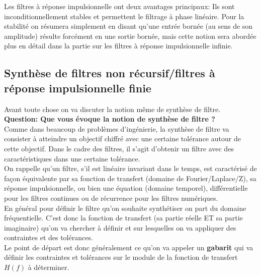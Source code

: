 \documentclass[11pt,a4paper]{article}
\begin{document}
Les filtres à réponse impulsionnelle ont deux avantages principaux: Ils sont inconditionnellement stables et permettent le filtrage à phase linéaire. Pour la stabilité on résumera simplement en disant qu'une entrée bornée (au sens de son amplitude) résulte forcément en une sortie bornée, mais cette notion sera abordée plus en détail dans la partie sur les filtres à réponse impulsionnelle infinie.\\

\subsection{Synthèse de filtres non récursif/filtres à réponse impulsionnelle finie} 
Avant toute chose on va discuter la notion même de synthèse de filtre.\\

\textbf{Question: Que vous évoque la notion de synthèse de filtre ?}\\

Comme dans beaucoup de problèmes d'ingénierie, la synthèse de filtre va consister à atteindre un objectif chiffré avec une certaine tolérance autour de cette objectif. Dans le cadre des filtres, il s'agit d'obtenir un filtre avec des caractéristiques dans une certaine tolérance.\\

On rappelle qu'un filtre, s'il est linéaire invariant dans le temps, est caractérisé de façon équivalente par sa fonction de transfert (domaine de Fourier/Laplace/Z), sa réponse impulsionnelle, ou bien une équation (domaine temporel), différentielle pour les filtres continues ou de récurrence pour les filtres numériques.\\

En général pour définir le filtre qu'on souhaite synthétiser on part du domaine fréquentielle. C'est donc la fonction de transfert (sa partie réelle ET sa partie imaginaire) qu'on va chercher à définir et sur lesquelles on va appliquer des contraintes et des tolérances.\\

Le point de départ est donc généralement ce qu'on va appeler un \textbf{gabarit} qui va définir les contraintes et tolérances sur le module de la fonction de transfert $H(f)$ à déterminer.

\begin{center}
\end{center}
\end{document}
